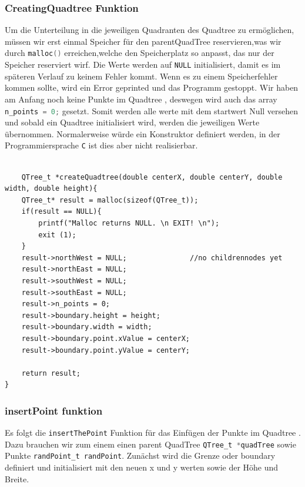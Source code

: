 \documentclass[11pt]{article}
\newcommand{\qt}{Quadtree }
\newcommand{\lstin}[1]{\lstinline[language=C]{#1}}
\begin{document}
\subsubsection{CreatingQuadtree Funktion}
Um die Unterteilung in die jeweiligen Quadranten des \qt zu ermöglichen, müssen wir erst einmal Speicher für den parentQuadTree reservieren,was wir durch \lstin{malloc()} erreichen,welche den Speicherplatz so anpasst, das nur der Speicher reserviert wirf. 
Die Werte werden auf \lstin{NULL} initialisiert, damit es im späteren Verlauf zu keinem Fehler kommt. 
Wenn es zu einem Speicherfehler kommen sollte, wird ein Error geprinted und das Programm gestoppt. 
Wir haben am Anfang noch keine Punkte im \qt, deswegen wird auch das array \lstin{n_points = 0;} gesetzt. 
Somit werden alle werte mit dem startwert Null versehen und sobald ein \qt initialisiert wird, werden die jeweiligen Werte übernommen. Normalerweise würde ein Konstruktor definiert werden, in der Programmiersprache \lstin{C} ist dies aber nicht realisierbar.

\begin{lstlisting}

    QTree_t *createQuadtree(double centerX, double centerY, double width, double height){
    QTree_t* result = malloc(sizeof(QTree_t));
    if(result == NULL){
        printf("Malloc returns NULL. \n EXIT! \n");
        exit (1); 
    }
    result->northWest = NULL;               //no childrennodes yet 
    result->northEast = NULL; 
    result->southWest = NULL; 
    result->southEast = NULL;
    result->n_points = 0; 
    result->boundary.height = height; 
    result->boundary.width = width; 
    result->boundary.point.xValue = centerX; 
    result->boundary.point.yValue = centerY; 

    return result; 
}
\end{lstlisting}

\subsubsection{insertPoint funktion}

Es folgt die \lstin{insertThePoint} Funktion für das Einfügen der Punkte im \qt. Dazu brauchen wir zum einem einen parent QuadTree \lstin{QTree_t *quadTree} sowie Punkte \lstin{randPoint_t randPoint}.\newline
Zunächst wird die Grenze oder boundary definiert und initialisiert mit den neuen x und y werten sowie der Höhe und Breite.
\end{document}
